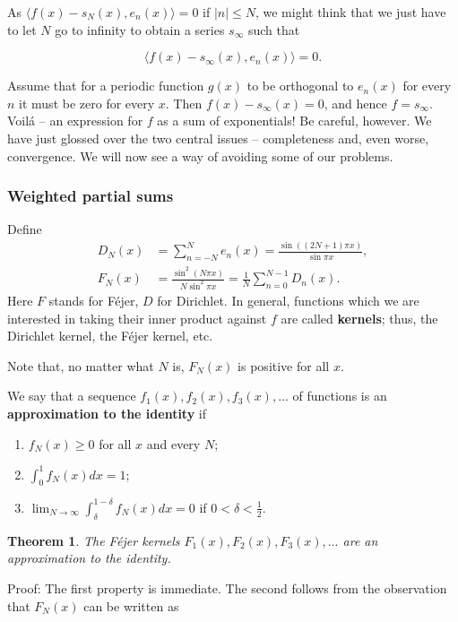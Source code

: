 \documentclass[12pt,letterpaper]{report}
\newcommand\be{\begin{equation}}
\newcommand\ee{\end{equation}}
\newcommand{\tbf}[1]{\textbf{#1}}
\newtheorem{thm}{Theorem}[section]
\begin{document}
As $\langle f(x) - s_N(x), e_n(x)\rangle = 0$ if $|n|\leq N$, we
might think that we just have to let $N$ go to infinity to obtain
a series $s_\infty$ such that

\be \langle f(x) - s_ \infty(x), e_n(x)\rangle = 0 .\ee

Assume that for a periodic function $g(x)$ to be orthogonal to
$e_n(x)$ for every $n$ it must be zero for every $x$. Then $f(x) -
s_\infty(x) = 0$, and hence $f = s_\infty$. Voil\'{a} -- an
expression for $f$ as a sum of exponentials! Be careful, however.
We have just glossed over the two central issues -- completeness
and, even worse, convergence. We will now see a way of avoiding
some of our problems.

\subsubsection{Weighted partial sums}

Define \be \begin{aligned} D_N(x) &= \sum_{n=-N}^N e_n(x) =
\frac{\sin((2 N + 1) \pi x)}{\sin \pi x},\\ F_N(x) &=
\frac{\sin^2( N \pi x)}{N \sin^2 \pi x} = \frac{1}{N}
\sum_{n=0}^{N-1} D_n(x) .\end{aligned}\ee  Here $F$ stands for
F\'{e}jer, $D$ for Dirichlet. In general, functions which we are
interested in taking their inner product against $f$ are called
\tbf{kernels}; thus, the Dirichlet kernel, the F\'{e}jer kernel,
etc.

Note that, no matter what $N$ is, $F_N(x)$ is positive for all
$x$.

We say that a sequence $f_1(x),f_2(x),f_3(x),\dots$ of functions
is an \tbf{approximation to the identity} if
\begin{enumerate}
\item $f_N(x)\geq 0$ for all $x$ and every $N$;
\item $\int_0^1 f_N(x) d x = 1$;
\item $\lim_{N\to \infty} \int_\delta^{1-\delta} f_N(x) d x = 0$ if $0<\delta<\frac{1}{2}$.
\end{enumerate}

\begin{thm}
The F\'{e}jer kernels $F_1(x), F_2(x), F_3(x),\dots$ are an
approximation to the identity.
\end{thm}

Proof: The first property is immediate. The second follows from
the observation that $F_N(x)$ can be written as
\end{document}

